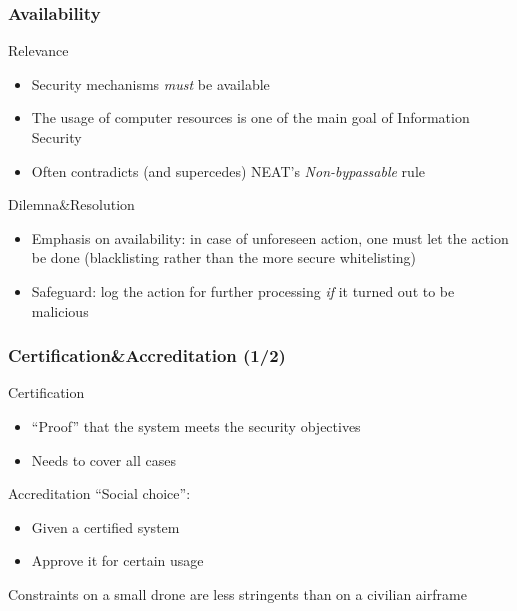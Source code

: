\begin{reveals}
\begin{frame}
  \vfill
  \end{frame}

  \begin{frame}
    \frametitle{Availability}

    \vfill

  \begin{block}{Relevance}
    \begin{itemize}
    \item Security mechanisms \emph{must} be available
    \item The usage of computer resources is one of the main goal of
      Information Security
    \item Often contradicts (and supercedes) NEAT's
      \emph{Non-bypassable} rule
    \end{itemize}
  \end{block}

  \vfill
  
  \begin{block}{Dilemna\&Resolution}
    \begin{itemize}
    \item Emphasis on availability: in case of unforeseen action, one
      must let the action be done (blacklisting rather than the more
      secure whitelisting)
    \item Safeguard: log the action for further processing \textit{if}
      it turned out to be malicious
    \end{itemize}
  \end{block}

  \vfill

\end{frame}

\begin{frame}
  \frametitle{Certification\&Accreditation (1/2)}

  \vfill

  \begin{block}{Certification}
    \begin{itemize}
    \item ``Proof'' that the system meets the security objectives
    \item Needs to cover all cases
    \end{itemize}
  \end{block}



  \vfill

  \begin{block}{Accreditation}
    ``Social choice'': 
    \begin{itemize}
    \item Given a certified system
    \item Approve it for certain usage
    \end{itemize}
    Constraints on a small drone are less stringents than on a
    civilian airframe
  \end{block}


\end{frame}
\end{reveals}
